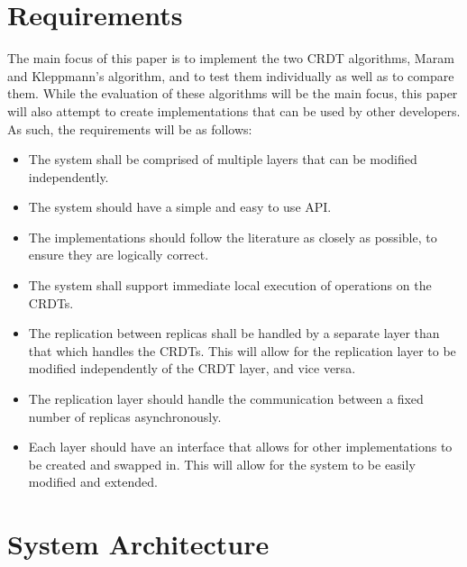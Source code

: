 \documentclass[12pt]{report}
\begin{document}
\section{Requirements}\label{sec:requirements}
The main focus of this paper is to implement the two CRDT algorithms, Maram\cite{9563274} and Kleppmann's algorithm\cite{https://doi.org/10.48550/arxiv.2103.04828}, and to test them individually as well as to compare them. While the evaluation of these algorithms will be the main focus, this paper will also attempt to create implementations that can be used by other developers. As such, the requirements will be as follows:
\begin{itemize}
    \item The system shall be comprised of multiple layers that can be modified independently.
    \item The system should have a simple and easy to use API.
    \item The implementations should follow the literature as closely as possible, to ensure they are logically correct.
    \item The system shall support immediate local execution of operations on the CRDTs.
    \item The replication between replicas shall be handled by a separate layer than that which handles the CRDTs. This will allow for the replication layer to be modified independently of the CRDT layer, and vice versa.
    \item The replication layer should handle the communication between a fixed number of replicas asynchronously.
    \item Each layer should have an interface that allows for other implementations to be created and swapped in. This will allow for the system to be easily modified and extended.
\end{itemize}


\section{System Architecture}\label{sec:architecture}
\end{document}
